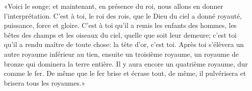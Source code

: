 «Voici le songe;
	et maintenant, en présence du roi, nous allons en donner l’interprétation.
C’est à toi, le roi des rois,
	que le Dieu du ciel a donné royauté, puissance, force et gloire.
C’est à toi qu’il a remis les enfants des hommes,
		les bêtes des champs et les oiseaux du ciel,
	quelle que soit leur demeure;
	c’est toi qu’il a rendu maître de toute chose:
	la tête d’or, c’est toi.
Après toi s’élèvera un autre royaume inférieur au tien,
	ensuite un troisième royaume, un royaume de bronze qui dominera la terre entière.
Il y aura encore un quatrième royaume, dur comme le fer.
	De même que le fer brise et écrase tout,
	de même, il pulvérisera et brisera tous les royaumes.»
